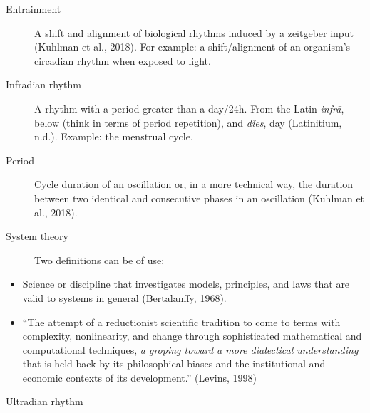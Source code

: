 \documentclass[
  12pt,
  a4paper,
  oneside]{tesesusp}
\providecommand{\tightlist}{%
  \setlength{\itemsep}{0pt}\setlength{\parskip}{0pt}}\usepackage{longtable,booktabs,array}
\begin{document}
\begin{termos}
\begin{description}
\item[Entrainment]
\hspace{20cm}

A shift and alignment of biological rhythms induced by a zeitgeber input
(Kuhlman et al., 2018). For example: a shift/alignment of an organism's
circadian rhythm when exposed to light.
\end{description}

\begin{description}
\item[Infradian rhythm]
\hspace{20cm}

A rhythm with a period greater than a day/24h. From the Latin
\emph{infrā}, below (think in terms of period repetition), and
\emph{dĭes}, day (Latinitium, n.d.). Example: the menstrual cycle.
\end{description}

\begin{description}
\item[Period]
\hspace{20cm}

Cycle duration of an oscillation or, in a more technical way, the
duration between two identical and consecutive phases in an oscillation
(Kuhlman et al., 2018).
\end{description}

\begin{description}
\item[System theory]
\hspace{20cm}

Two definitions can be of use:
\end{description}

\begin{itemize}
\tightlist
\item
  Science or discipline that investigates models, principles, and laws
  that are valid to systems in general (Bertalanffy, 1968).
\item
  ``The attempt of a reductionist scientific tradition to come to terms
  with complexity, nonlinearity, and change through sophisticated
  mathematical and computational techniques, \emph{a groping toward a
  more dialectical understanding} that is held back by its philosophical
  biases and the institutional and economic contexts of its
  development.'' (Levins, 1998)
\end{itemize}

\begin{description}
\item[Ultradian rhythm]
\hspace{20cm}


\end{description}
\end{termos}
\end{document}

